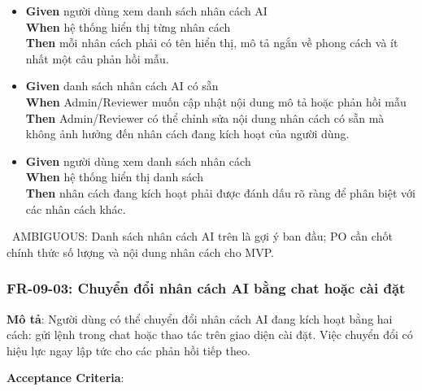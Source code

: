\begin{itemize}
\item \textbf{Given} người dùng xem danh sách nhân cách AI  \\ \hspace*{1.5em}  \textbf{When} hệ thống hiển thị từng nhân cách  \\ \hspace*{1.5em}  \textbf{Then} mỗi nhân cách phải có tên hiển thị, mô tả ngắn về phong cách và ít nhất một câu phản hồi mẫu.
\item \textbf{Given} danh sách nhân cách AI có sẵn  \\ \hspace*{1.5em}  \textbf{When} Admin/Reviewer muốn cập nhật nội dung mô tả hoặc phản hồi mẫu  \\ \hspace*{1.5em}  \textbf{Then} Admin/Reviewer có thể chỉnh sửa nội dung nhân cách có sẵn mà không ảnh hưởng đến nhân cách đang kích hoạt của người dùng.
\item \textbf{Given} người dùng xem danh sách nhân cách  \\ \hspace*{1.5em}  \textbf{When} hệ thống hiển thị danh sách  \\ \hspace*{1.5em}  \textbf{Then} nhân cách đang kích hoạt phải được đánh dấu rõ ràng để phân biệt với các nhân cách khác.
\end{itemize}
\warningicon\  AMBIGUOUS: Danh sách nhân cách AI trên là gợi ý ban đầu; PO cần chốt chính thức số lượng và nội dung nhân cách cho MVP.



\subsubsection{FR-09-03: Chuyển đổi nhân cách AI bằng chat hoặc cài đặt}

\textbf{Mô tả}: Người dùng có thể chuyển đổi nhân cách AI đang kích hoạt bằng hai cách: gửi lệnh trong chat hoặc thao tác trên giao diện cài đặt. Việc chuyển đổi có hiệu lực ngay lập tức cho các phản hồi tiếp theo.



\textbf{Acceptance Criteria}:

